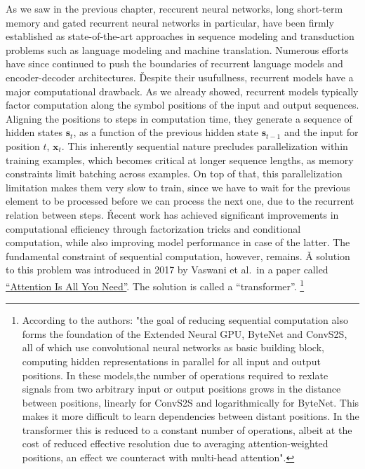 As we saw in the previous chapter, reccurent neural networks, long short-term memory and gated recurrent neural
networks in particular, have been firmly established as state-of-the-art approaches in sequence modeling and
transduction problems such as language modeling and machine translation. Numerous efforts have since continued to
push the boundaries of recurrent language models and encoder-decoder architectures. \v

Despite their usufullness, recurrent models have a major computational drawback. As we already showed, recurrent
models typically factor computation along the symbol positions of the input and output sequences. Aligning the
positions to steps in computation time, they generate a sequence of hidden states $\boldsymbol{s}_{t}$, as a
function of the previous hidden state $\boldsymbol{s}_{t-1}$ and the input for position $t$, $\boldsymbol{x}_{t}$.
This inherently sequential nature precludes parallelization within training examples, which becomes critical at
longer sequence lengths, as memory constraints limit batching across examples. On top of that, this parallelization
limitation makes them very slow to train, since we have to wait for the previous element to be processed before we
can process the next one, due to the recurrent relation between steps. \v

Recent work has achieved significant improvements in computational efficiency through factorization tricks and
conditional computation, while also improving model performance in case of the latter. The fundamental constraint of
sequential computation, however, remains. \v

A solution to this problem was introduced in 2017 by Vaswani et al.\ in a paper called
\href{https://arxiv.org/pdf/1706.03762}{``Attention Is All You Need''}. The solution is called a ``transformer''.
\footnote{According to the authors: "the goal of reducing sequential computation also forms the foundation of the
Extended Neural GPU, ByteNet and ConvS2S, all of which use convolutional neural networks as basic building block,
computing hidden representations in parallel for all input and output positions. In these models,the number of
operations required to rexlate signals from two arbitrary input or output positions grows in the distance between
positions, linearly for ConvS2S and logarithmically for ByteNet. This makes it more difficult to learn dependencies
between distant positions. In the transformer this is reduced to a constant number of operations, albeit at the cost of
reduced effective resolution due to averaging attention-weighted positions, an effect we counteract with multi-head
attention".}

